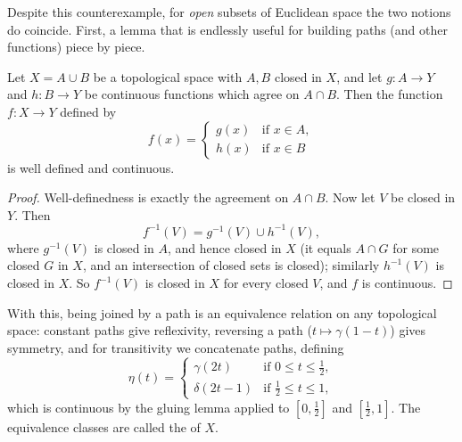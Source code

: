 Despite this counterexample, for \emph{open} subsets of Euclidean space the two notions do coincide. First, a lemma that is endlessly useful for building paths (and other functions) piece by piece.

\begin{lemma}
    Let $X = A \cup B$ be a topological space with $A, B$ closed in $X$, and let $g: A \rightarrow Y$ and $h: B \rightarrow Y$ be continuous functions which agree on $A \cap B$. Then the function $f: X \rightarrow Y$ defined by
    $$
    f(x) = \begin{cases}
        g(x) &\mbox{if } x \in A, \\
        h(x) &\mbox{if } x \in B
       \end{cases}
    $$
    is well defined and continuous.
\end{lemma}
\begin{proof}
    Well-definedness is exactly the agreement on $A \cap B$. Now let $V$ be closed in $Y$. Then
    $$
    f^{-1}(V) = g^{-1}(V) \cup h^{-1}(V),
    $$
    where $g^{-1}(V)$ is closed in $A$, and hence closed in $X$ (it equals $A \cap G$ for some closed $G$ in $X$, and an intersection of closed sets is closed); similarly $h^{-1}(V)$ is closed in $X$. So $f^{-1}(V)$ is closed in $X$ for every closed $V$, and $f$ is continuous.
\end{proof}

With this, being joined by a path is an equivalence relation on any topological space: constant paths give reflexivity, reversing a path ($t \mapsto \gamma(1 - t)$) gives symmetry, and for transitivity we concatenate paths, defining
$$
\eta(t) = \begin{cases}
    \gamma(2t) &\mbox{if } 0 \leq t \leq \frac{1}{2}, \\
    \delta(2t - 1) &\mbox{if } \frac{1}{2} \leq t \leq 1,
   \end{cases}
$$
which is continuous by the gluing lemma applied to $[0, \frac{1}{2}]$ and $[\frac{1}{2}, 1]$. The equivalence classes are called the  of $X$.

